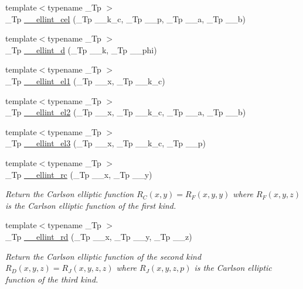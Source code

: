 \begin{DoxyCompactItemize}
{\footnotesize template$<$typename \+\_\+\+Tp $>$ }\\\+\_\+\+Tp \hyperlink{namespacestd_1_1____detail_a7c7d04715f0d40e054299312db35e32d}{\+\_\+\+\_\+ellint\+\_\+cel} (\+\_\+\+Tp \+\_\+\+\_\+k\+\_\+c, \+\_\+\+Tp \+\_\+\+\_\+p, \+\_\+\+Tp \+\_\+\+\_\+a, \+\_\+\+Tp \+\_\+\+\_\+b)
\item 
{\footnotesize template$<$typename \+\_\+\+Tp $>$ }\\\+\_\+\+Tp \hyperlink{namespacestd_1_1____detail_a00da42d89830fd51e9934fe0c5e08b7f}{\+\_\+\+\_\+ellint\+\_\+d} (\+\_\+\+Tp \+\_\+\+\_\+k, \+\_\+\+Tp \+\_\+\+\_\+phi)
\item 
{\footnotesize template$<$typename \+\_\+\+Tp $>$ }\\\+\_\+\+Tp \hyperlink{namespacestd_1_1____detail_aa17b1b382a89552f49fbb8c5eda1d50f}{\+\_\+\+\_\+ellint\+\_\+el1} (\+\_\+\+Tp \+\_\+\+\_\+x, \+\_\+\+Tp \+\_\+\+\_\+k\+\_\+c)
\item 
{\footnotesize template$<$typename \+\_\+\+Tp $>$ }\\\+\_\+\+Tp \hyperlink{namespacestd_1_1____detail_a82449d0f05d40ba2cef6b8fc57dd5bae}{\+\_\+\+\_\+ellint\+\_\+el2} (\+\_\+\+Tp \+\_\+\+\_\+x, \+\_\+\+Tp \+\_\+\+\_\+k\+\_\+c, \+\_\+\+Tp \+\_\+\+\_\+a, \+\_\+\+Tp \+\_\+\+\_\+b)
\item 
{\footnotesize template$<$typename \+\_\+\+Tp $>$ }\\\+\_\+\+Tp \hyperlink{namespacestd_1_1____detail_a2a2b5b80edd39b3d1f852f10c5f277fc}{\+\_\+\+\_\+ellint\+\_\+el3} (\+\_\+\+Tp \+\_\+\+\_\+x, \+\_\+\+Tp \+\_\+\+\_\+k\+\_\+c, \+\_\+\+Tp \+\_\+\+\_\+p)
\item 
{\footnotesize template$<$typename \+\_\+\+Tp $>$ }\\\+\_\+\+Tp \hyperlink{namespacestd_1_1____detail_aa7d81e41240a6d031414c6b117889e36}{\+\_\+\+\_\+ellint\+\_\+rc} (\+\_\+\+Tp \+\_\+\+\_\+x, \+\_\+\+Tp \+\_\+\+\_\+y)
\begin{DoxyCompactList}\small\item\em Return the Carlson elliptic function $ R_C(x,y) = R_F(x,y,y) $ where $ R_F(x,y,z) $ is the Carlson elliptic function of the first kind. \end{DoxyCompactList}\item 
{\footnotesize template$<$typename \+\_\+\+Tp $>$ }\\\+\_\+\+Tp \hyperlink{namespacestd_1_1____detail_ac05883415a662fc6f9855dd8d1da921f}{\+\_\+\+\_\+ellint\+\_\+rd} (\+\_\+\+Tp \+\_\+\+\_\+x, \+\_\+\+Tp \+\_\+\+\_\+y, \+\_\+\+Tp \+\_\+\+\_\+z)
\begin{DoxyCompactList}\small\item\em Return the Carlson elliptic function of the second kind $ R_D(x,y,z) = R_J(x,y,z,z) $ where $ R_J(x,y,z,p) $ is the Carlson elliptic function of the third kind. \end{DoxyCompactList}\item 

\end{DoxyCompactItemize}
